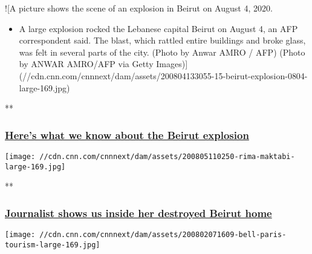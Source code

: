 \href{/videos/world/2020/08/04/beirut-explosion-video-mss-orig.cnn/video/playlists/around-the-world/}{}

!{[}A picture shows the scene of an explosion in Beirut on August 4,
2020.

\begin{itemize}
\tightlist
\item
  A large explosion rocked the Lebanese capital Beirut on August 4, an
  AFP correspondent said. The blast, which rattled entire buildings and
  broke glass, was felt in several parts of the city. (Photo by Anwar
  AMRO / AFP) (Photo by ANWAR AMRO/AFP via Getty
  Images){]}(//cdn.cnn.com/cnnnext/dam/assets/200804133055-15-beirut-explosion-0804-large-169.jpg)
\end{itemize}

**

\hypertarget{heres-what-we-know-about-the-beirut-explosion}{%
\subsubsection{\texorpdfstring{\href{/videos/world/2020/08/04/beirut-explosion-video-mss-orig.cnn/video/playlists/around-the-world/}{Here's
what we know about the Beirut
explosion}}{Here's what we know about the Beirut explosion}}\label{heres-what-we-know-about-the-beirut-explosion}}

\href{/videos/world/2020/08/05/rima-maktabi-journalist-home-destroyed-beirut-explosion-ctw-vpx.cnn/video/playlists/around-the-world/}{}

\texttt{[image: //cdn.cnn.com/cnnnext/dam/assets/200805110250-rima-maktabi-large-169.jpg]}

**

\hypertarget{journalist-shows-us-inside-her-destroyed-beirut-home}{%
\subsubsection{\texorpdfstring{\href{/videos/world/2020/08/05/rima-maktabi-journalist-home-destroyed-beirut-explosion-ctw-vpx.cnn/video/playlists/around-the-world/}{Journalist
shows us inside her destroyed Beirut
home}}{Journalist shows us inside her destroyed Beirut home}}\label{journalist-shows-us-inside-her-destroyed-beirut-home}}

\href{/videos/travel/2020/08/02/paris-france-tourism-coronavirus-bell-pkg-vpx.cnn/video/playlists/around-the-world/}{}

\texttt{[image: //cdn.cnn.com/cnnnext/dam/assets/200802071609-bell-paris-tourism-large-169.jpg]}

